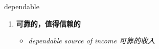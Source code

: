 
\begin{frame}
{\huge dependable}
\begin{center}
\begin{enumerate}\Large
  \item \textbf{可靠的，值得信赖的}
  \begin{itemize}
    \item \em{\Large{dependable source of income 可靠的收入}}
  \end{itemize}
\end{enumerate}
\end{center}
\end{frame}
